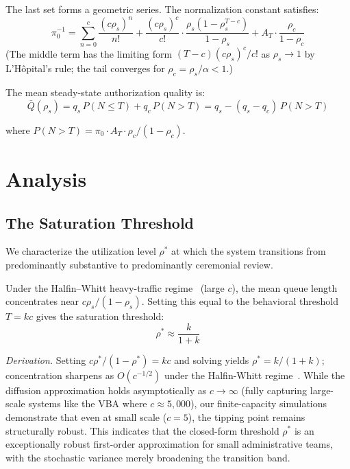 \documentclass[runningheads]{llncs}
\begin{document}
The last set forms a geometric series. The normalization constant satisfies:
\begin{equation}
\pi_0^{-1} = \sum_{n=0}^{c} \frac{(c\rho_s)^n}{n!}
  + \frac{(c\rho_s)^c}{c!} \cdot \frac{\rho_s(1-\rho_s^{T-c})}{1-\rho_s}
  + A_T \cdot \frac{\rho_c}{1-\rho_c}
\label{eq:normalization}
\end{equation}
(The middle term has the limiting form $(T{-}c)(c\rho_s)^c/c!$ as $\rho_s\to 1$
by L'H\^opital's rule; the tail converges for $\rho_c = \rho_s/\alpha < 1$.)

The mean steady-state authorization quality is:
\begin{equation}
\bar{Q}(\rho_s) = q_s\, P(N \leq T) + q_c\, P(N > T)
= q_s - (q_s - q_c)\, P(N > T)
\label{eq:quality-mean}
\end{equation}

where $P(N > T) = \pi_0 \cdot A_T \cdot \rho_c/(1-\rho_c)$.

\section{Analysis}
\label{sec:analysis}

\subsection{The Saturation Threshold}

We characterize the utilization level $\rho^*$ at which the system transitions
from predominantly substantive to predominantly ceremonial review.

\begin{proposition}
\label{thm:threshold}
Under the Halfin--Whitt heavy-traffic regime~\cite{halfin1981} (large $c$), the
mean queue length concentrates near $c\rho_s/(1-\rho_s)$. Setting this equal
to the behavioral threshold $T = kc$ gives the saturation threshold:
\begin{equation}
\rho^* \approx \frac{k}{1+k}
\label{eq:threshold}
\end{equation}
\end{proposition}

\noindent\textit{Derivation.}
Setting $c\rho^*/(1-\rho^*) = kc$ and solving yields $\rho^* = k/(1+k)$;
concentration sharpens as $O(c^{-1/2})$ under the Halfin-Whitt regime~\cite{halfin1981}.
While the diffusion approximation holds asymptotically as $c \to \infty$ (fully capturing large-scale systems like the VBA where $c \approx 5{,}000$), our finite-capacity simulations demonstrate that even at small scale ($c = 5$), the tipping point remains structurally robust. This indicates that the closed-form threshold $\rho^*$ is an exceptionally robust first-order approximation for small administrative teams, with the stochastic variance merely broadening the transition band.
\end{document}
